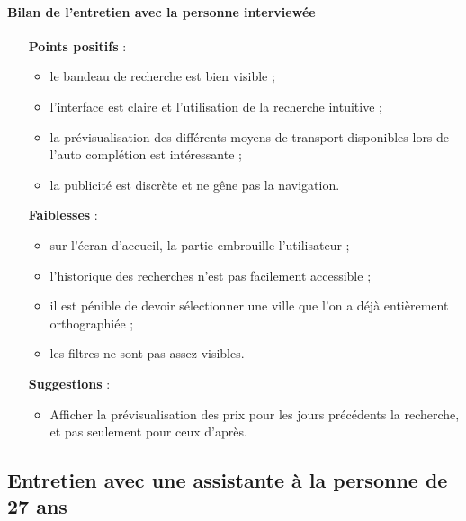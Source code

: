 \paragraph{Bilan de l'entretien avec la personne interview\'{e}e}

\begin{itemize}
  \item [\textbf{Points positifs}] :
      \begin{itemize}
      	\item le bandeau de recherche est bien visible ;
        \item l'interface est claire et l'utilisation de la recherche intuitive ;
        \item la pr\'{e}visualisation des diff\'{e}rents moyens de transport disponibles lors de l'auto compl\'{e}tion est int\'{e}ressante ;
        \item la publicit\'{e} est discr\`{e}te et ne g\^{e}ne pas la navigation.
      \end{itemize}
      
  \item [\textbf{Faiblesses}] :
      \begin{itemize}
      	\item sur l'\'{e}cran d'accueil, la partie  embrouille l'utilisateur ;
      	\item l'historique des recherches n'est pas facilement accessible ;
        \item il est p\'{e}nible de devoir s\'{e}lectionner une ville que l'on a d\'{e}j\`{a} enti\`{e}rement orthographi\'{e}e ;
        \item les filtres ne sont pas assez visibles.
      \end{itemize}
      
  \item [\textbf{Suggestions}] :
      \begin{itemize}
      	\item Afficher la pr\'{e}visualisation des prix pour les jours pr\'{e}c\'{e}dents la recherche, et pas seulement pour ceux d'apr\`{e}s.
      \end{itemize}
\end{itemize}




\subsection{Entretien avec une assistante \`{a} la personne de 27 ans}

